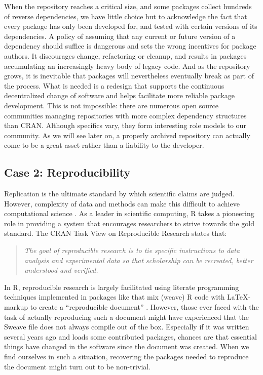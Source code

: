 When the repository reaches a critical size, and some packages collect hundreds
of reverse dependencies, we have little choice but to acknowledge the fact that
every package has only been developed for, and tested with certain versions of
its dependencies. A policy of assuming that any current or future version of a
dependency should suffice is dangerous and sets the wrong incentives for package
authors. It discourages change, refactoring or cleanup, and results in packages
accumulating an increasingly heavy body of legacy code. And as the repository
grows, it is inevitable that packages will nevertheless eventually break as
part of the process.
What is needed is a redesign that supports the continuous decentralized change
of software and helps facilitate more reliable package development. This is not
impossible: there are numerous open source communities managing repositories with
more complex dependency structures than CRAN. Although specifics vary, they form
interesting role models to our community. As we will see later on, a properly
archived repository can actually come to be a great asset rather than a
liability to the developer.

\subsection{Case 2: Reproducibility}

Replication is the ultimate standard by which scientific claims are judged. However,
complexity of data and methods can make this difficult to achieve computational
science \citep{peng2011reproducible}. As a leader in scientific computing, R
takes a pioneering role in providing a system that encourages researchers to strive
towards the gold standard. The CRAN Task View on Reproducible Research states
that:

\begin{quote}
\emph{The goal of reproducible research is to tie specific instructions
to data analysis and experimental data so that scholarship can be recreated,
better understood and verified.}
\end{quote}
In R, reproducible research is largely facilitated using literate programming
techniques implemented in packages like  that mix (weave) R code
with \LaTeX-markup to create a ``reproducible document''
\citep{leisch2002sweave}. However, those ever faced with the task of actually
reproducing such a document might have experienced that the Sweave file does not
always compile out of the box. Especially if it was written several years ago
and loads some contributed packages, chances are that essential things have
changed in the software since the document was created. When we find ourselves
in such a situation, recovering the packages needed to reproduce the document
might turn out to be non-trivial.

